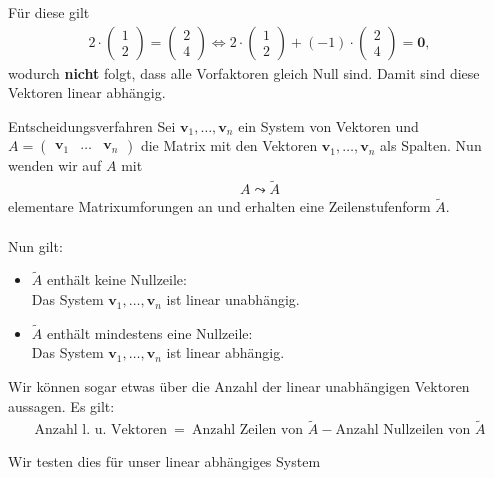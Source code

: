 Für diese gilt
\begin{align*}
2 \cdot 
\begin{pmatrix}
1 \\2
\end{pmatrix}
= \begin{pmatrix}
2 \\4
\end{pmatrix}
\Leftrightarrow
2 \cdot 
\begin{pmatrix}
1 \\2
\end{pmatrix} 
+ (-1) \cdot
\begin{pmatrix}
2 \\4
\end{pmatrix}
= \textbf{0},
\end{align*}
wodurch \textbf{nicht} folgt, dass alle Vorfaktoren gleich Null sind.
Damit sind diese Vektoren linear abhängig.
\newpage
\begin{mybox}{Entscheidungsverfahren}
Sei $\textbf{v}_1, \dots, \textbf{v}_n$ ein System von Vektoren und $A = \begin{pmatrix} \textbf{v}_1 & \dots & \textbf{v}_n \end{pmatrix} $ die Matrix mit den Vektoren $\textbf{v}_1, \dots, \textbf{v}_n$ als Spalten.
Nun wenden wir auf $A$ mit
\begin{align*}
A \leadsto \tilde{A}
\end{align*}
elementare Matrixumforungen an und erhalten eine Zeilenstufenform $\tilde{A}$.\\ \\
Nun gilt:
\begin{itemize}
\item
$\tilde{A}$ enthält keine Nullzeile:\\ 
Das System $\textbf{v}_1, \dots, \textbf{v}_n$ ist linear unabhängig.

\item
$\tilde{A}$ enthält mindestens eine Nullzeile:\\
Das System $\textbf{v}_1, \dots, \textbf{v}_n$ ist linear abhängig.
\end{itemize}
Wir können sogar etwas über die Anzahl der linear unabhängigen Vektoren aussagen.
Es gilt:
\begin{align*}
\text{Anzahl l. u. Vektoren} \ = \ \text{Anzahl Zeilen von } \tilde{A} - \text{Anzahl Nullzeilen von } \tilde{A}
\end{align*}
\end{mybox}
Wir testen dies für unser linear abhängiges System
